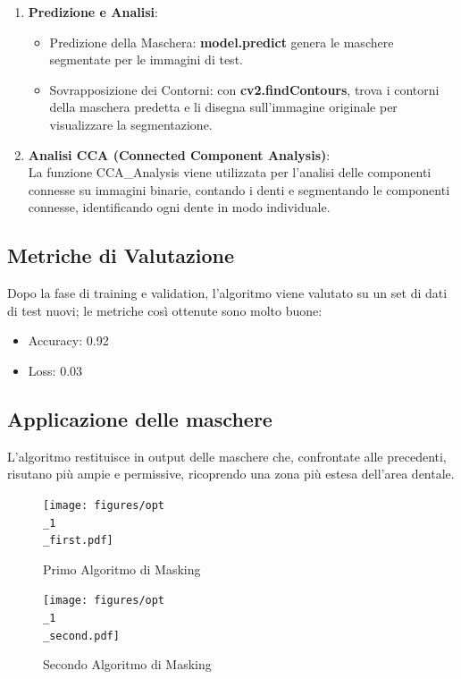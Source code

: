 \documentclass[12pt,a4paper,openright,twoside]{book}
\begin{document}
\begin{enumerate}
\item \textbf{Predizione e Analisi}:
\begin{itemize}
\item Predizione della Maschera: \textbf{model.predict} genera le maschere segmentate per le immagini di test.
\item Sovrapposizione dei Contorni: con \textbf{cv2.findContours}, trova i contorni della maschera predetta e li disegna sull'immagine originale per visualizzare la segmentazione.
\end{itemize}
\item \textbf{Analisi CCA (Connected Component Analysis)}:\\
La funzione CCA\_Analysis viene utilizzata per l'analisi delle componenti connesse su immagini binarie, contando i denti e segmentando le componenti connesse, identificando ogni dente in modo individuale.
\end{enumerate}

\subsection{Metriche di Valutazione}
Dopo la fase di training e validation, l'algoritmo viene valutato su un set di dati di test nuovi; le metriche così ottenute sono molto buone:
\begin{itemize}
\item Accuracy: 0.92
\item Loss: 0.03
\end{itemize}

\subsection{Applicazione delle maschere}
L'algoritmo restituisce in output delle maschere che, confrontate alle precedenti, risutano più ampie e permissive, ricoprendo una zona più estesa dell'area dentale.
\begin{figure}[H]
    \centering
    \begin{minipage}{0.45\textwidth}
	\centering
    	\texttt{[image: figures/opt\\\_1\\\_first.pdf]}
    	\caption{Primo Algoritmo di Masking}
    	\label{lab:Maschera 2 opt1}
    \end{minipage}\hfill
    \begin{minipage}{0.45\textwidth}
    	\centering
    	\texttt{[image: figures/opt\\\_1\\\_second.pdf]}
    	\caption{Secondo Algoritmo di Masking}
    	\label{lab:Maschera 1 opt1}
    \end{minipage}\hfill
\end{figure}
\end{document}
